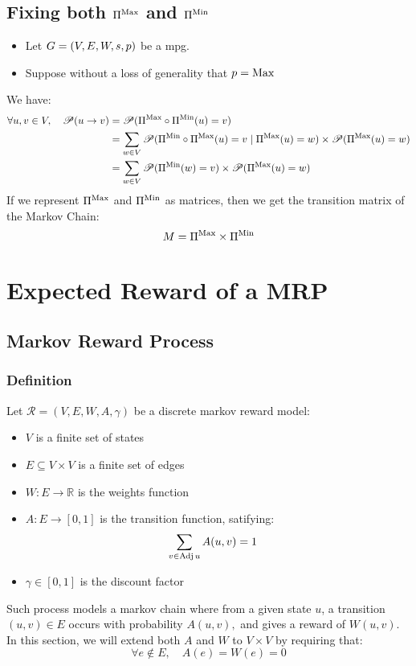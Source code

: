 \subsection{Fixing both $\Pi^{\operatorname{Max}}$ and $\Pi^{\operatorname{Min}}$}
\label{section:ProbabilisticStrategies:MRP}
\begin{itemize}
	\item Let $G=(V,E,W,s,p)$ be a \acrshort{mpg}.
	\item Suppose without a loss of generality that $p=\operatorname{Max}$
\end{itemize}

We have:
\begin{align*}
	\forall u,v\in V,\quad \mathscr{P}(u\rightarrow v) &=\mathscr{P}(\Pi^{\operatorname{Max}}\circ \Pi^{\operatorname{Min}} (u)= v) \\
	&=\sum_{w\in V} \mathscr{P}(\Pi^{\operatorname{Min}}\circ \Pi^{\operatorname{Max}} (u)= v\mid \Pi^{\operatorname{Max}}(u)=w) \times \mathscr{P}(\Pi^{\operatorname{Max}}(u)=w) \\
	&= \sum_{w\in V}\mathscr{P}(\Pi^{\operatorname{Min}}(w)= v) \times \mathscr{P}(\Pi^{\operatorname{Max}}(u)=w) \\
\end{align*}
If we represent $\Pi^{\operatorname{Max}}$ and $\Pi^{\operatorname{Min}}$ as matrices, then we get the transition matrix of the Markov Chain:
\begin{equation}
	M=\Pi^{\operatorname{Max}} \times \Pi^{\operatorname{Min}}
\end{equation}


\section{Expected Reward of a MRP}
\subsection{Markov Reward Process}
\subsubsection{Definition}
Let $\mathcal{R}=(V,E,W,A,\gamma)$ be a discrete markov reward model:
\begin{itemize}
	\item $V$ is a finite set of states
	\item $E\subseteq V\times V$ is a finite set of edges
	\item $W:E\rightarrow \mathbb{R}$ is the weights function
	\item  $A:E\rightarrow [0,1]$ is the transition function, satifying:
	\begin{align}
		\sum_{v\in\operatorname{Adj} u} A(u,v) &= 1 
	\end{align}
	\item $\gamma\in [0,1]$ is the discount factor
\end{itemize}
Such process models a markov chain where from a given state $u$, a transition $(u,v)\in E$ occurs with probability $A(u,v),$ and gives a reward of $W(u,v).$
\newline 
In this section, we will extend both $A$ and $W$ to $V\times V$ by requiring that:
$$
\forall e \notin E, \quad A(e)=W(e)=0
$$
